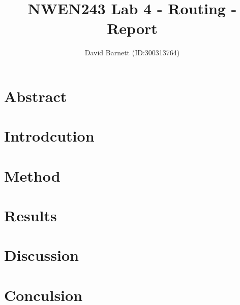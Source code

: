 \documentclass[12pt]{article}
\author{David Barnett (ID:300313764)}
\title{NWEN243 Lab 4 - Routing - Report}
\date{}
\begin{document}
\maketitle

\section*{Abstract}

\section*{Introdcution}

\section*{Method}

\section*{Results}

\section*{Discussion}

\section*{Conculsion}
\end{document}
